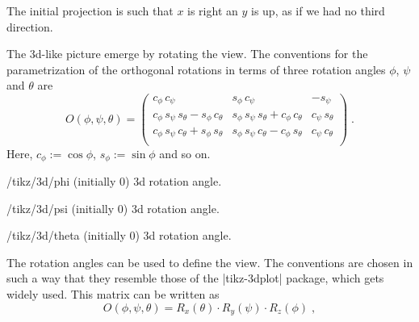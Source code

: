 \documentclass[a4paper]{ltxdoc}
\begin{document}
The initial projection is such that $x$ is right an $y$ is up, as if we had no
third direction.

\begin{codeexample}[width=2cm]
\end{codeexample}



The 3d-like picture emerge by rotating the view. The conventions for the
parametrization of the orthogonal rotations in terms of three rotation angles
$\phi$, $\psi$ and $\theta$ are
\[ O(\phi,\psi,\theta)=\begin{pmatrix}
 c_{\phi}\,c_{\psi} & s_{\phi}\,c_{\psi} & -s_{\psi} \\
 c_{\phi}\,s_{\psi}\,s_{\theta}-s_{\phi}\,c_{\theta} & 
 s_{\phi}\,s_{\psi}\,s_{\theta}+c_{\phi}\,c_{\theta} 
 & c_{\psi}\,s_{\theta} \\
 c_{\phi}\,s_{\psi}\,c_{\theta}+s_{\phi}\,s_{\theta} 
 & s_{\phi}\,s_{\psi}\,c_{\theta}-c_{\phi}\,s_{\theta} & c_{\psi}\,c_{\theta} \\
\end{pmatrix}\;.
\]
Here, $c_\phi:=\cos\phi$, $s_\phi:=\sin\phi$ and so on.
\begin{key}{/tikz/3d/phi (initially 0)}
        3d rotation angle.
\end{key}
\begin{key}{/tikz/3d/psi (initially 0)}
        3d rotation angle.
\end{key}
\begin{key}{/tikz/3d/theta (initially 0)}
        3d rotation angle.
\end{key}
The rotation angles can be used to define the view. The conventions are chosen
in such a way that they resemble those of the |tikz-3dplot| package, which gets
widely used. This matrix can be written as 
\[O(\phi,\psi,\theta)=R_x(\theta)\cdot R_y(\psi)\cdot R_z(\phi)\;,\]
\end{document}

